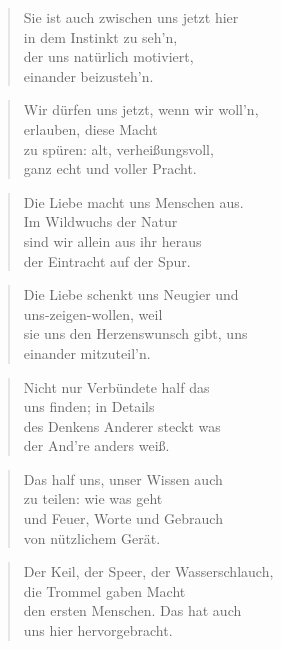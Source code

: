 \documentclass[10pt,a4paper]{article}
\begin{document}
\begin{multicols}{2}
\begin{verse}
Sie ist auch zwischen uns jetzt hier \\
in dem Instinkt zu seh’n, \\
der uns natürlich motiviert, \\
einander beizusteh’n. \\
\end{verse}

\begin{verse}
Wir dürfen uns jetzt, wenn wir woll’n, \\
erlauben, diese Macht \\
zu spüren: alt, verheißungsvoll, \\
ganz echt und voller Pracht. \\
\end{verse}

\begin{verse}
Die Liebe macht uns Menschen aus. \\
Im Wildwuchs der Natur \\
sind wir allein aus ihr heraus \\
der Eintracht auf der Spur. \\
\end{verse}

\begin{verse}
Die Liebe schenkt uns Neugier und \\
uns-zeigen-wollen, weil \\
sie uns den Herzenswunsch gibt, uns \\
einander mitzuteil’n. \\
\end{verse}

\begin{verse}
Nicht nur Verbündete half das \\
uns finden; in Details \\
des Denkens Anderer steckt was \\
der And’re anders weiß. \\
\end{verse}

\begin{verse}
Das half uns, unser Wissen auch \\
zu teilen: wie was geht \\
und Feuer, Worte und Gebrauch \\
von nützlichem Gerät. \\
\end{verse}

\begin{verse}
Der Keil, der Speer, der Wasserschlauch, \\
die Trommel gaben Macht \\
den ersten Menschen. Das hat auch \\
uns hier hervorgebracht. \\
\end{verse}


\end{multicols}
\end{document}
